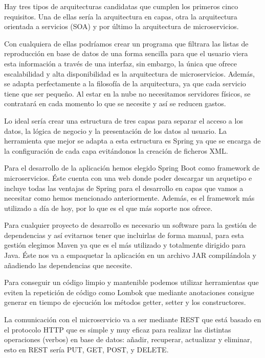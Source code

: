 \documentclass[12pt]{report} %
\begin{document}
Hay tres tipos de arquitecturas candidatas que cumplen los primeros cinco requisitos. Una de ellas sería la arquitectura en capas, otra la arquitectura orientada a servicios (SOA) y por último la arquitectura de microservicios. 

Con cualquiera de ellas podríamos crear un programa que filtrara las listas de reproducción en base de datos de una forma sencilla para que el usuario viera esta información a través de una interfaz, sin embargo, la única que ofrece escalabilidad y alta disponibilidad es la arquitectura de microservicios. Además, se adapta perfectamente a la filosofía de la arquitectura, ya que cada servicio tiene que ser pequeño. Al estar en la nube no necesitamos servidores físicos, se contratará en cada momento lo que se necesite y así se reducen gastos.

Lo ideal sería crear una estructura de tres capas para separar el acceso a los datos, la lógica de negocio y la presentación de los datos al usuario. La herramienta que mejor se adapta a esta estructura es Spring ya que se encarga de la configuración de cada capa evitándonos la creación de ficheros XML.

Para el desarrollo de la aplicación hemos elegido Spring Boot como framework de microservicios. Éste cuenta con una web donde poder descargar un arquetipo e incluye todas las ventajas de Spring para el desarrollo en capas que vamos a necesitar como hemos mencionado anteriormente. Además, es el framework más utilizado a día de hoy, por lo que es el que más soporte nos ofrece.

Para cualquier proyecto de desarrollo es necesario un software para la gestión de dependencias y así evitarnos tener que incluirlas de forma manual, para esta gestión elegimos Maven ya que es el más utilizado y totalmente dirigido para Java. Éste nos va a empaquetar la aplicación en un archivo JAR compilándola y añadiendo las dependencias que necesite.

Para conseguir un código limpio y mantenible podemos utilizar herramientas que eviten la repetición de código como Lombok que mediante anotaciones consigue generar en tiempo de ejecución los métodos getter, setter y los constructores.

La comunicación con el microservicio va a ser mediante REST que está basado en el protocolo HTTP que es simple y muy eficaz para realizar las distintas operaciones (verbos) en base de datos: añadir, recuperar, actualizar y eliminar, esto en REST sería PUT, GET, POST, y DELETE.
\end{document}
